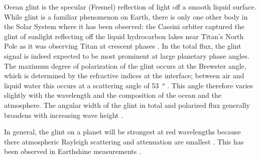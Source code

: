 \documentclass[usenatbib]{mnras}
\begin{document}
Ocean glint is the specular (Fresnel) reflection of light off a smooth liquid surface. 
While glint is a familiar phenomenon on Earth, there is only one other body in the Solar System where it has been observed: the Cassini orbiter captured the glint of sunlight reflecting off the liquid hydrocarbon lakes near Titan's North Pole as it was observing %
Titan at crescent phases \citep{2010GeoRL..37.7104S}.
In the total flux, the glint signal is indeed expected to be most prominent at large planetary phase angles.
The maximum degree of polarization of the glint occurs at the Brewster angle, which is determined by the refractive indices at the interface; between air and liquid water this occurs at a scattering angle of \qty{53}{\degree} \citep[i.e., at a planetary phase angle of \qty{106}{\degree}; see, e.g.,][]
{Zugger_2010,treesandstam2019}.
This angle therefore varies slightly with the wavelength and the composition of the ocean and the atmosphere.
The angular width of the glint in total and polarized flux generally broadens with increasing wave height \citep{2008Icar..195..927W, kopparla2018, treesandstam2019, trees2022}.

In general, the glint on a planet will be strongest at red wavelengths because there atmospheric Rayleigh scattering and attenuation are smallest \citep{Zugger_2011}. This has been observed in Earthshine measurements \citep{Emde2017,sterzik2019, takahashi2021}. %
%
%
\end{document}
